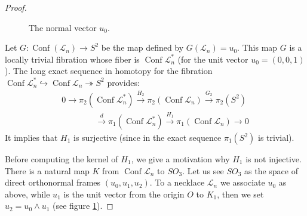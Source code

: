 \documentclass[11pt]{amsart}
\begin{document}
\begin{proof}
\begin{figure}
 
 \caption{The normal vector $u_0$. \label{fig:uzero}}
\end{figure}

Let $G : {\mathop{\mathrm{Conf}}\nolimits}(\mathcal{L}_n) \to S^2$ be the map defined
by $G(\mathcal{L}_n) = u_0$. This map $G$ is a locally trivial fibration
whose fiber is ${\mathop{\mathrm{Conf}}\nolimits} \mathcal{L}_n^*$ (for the unit vector $u_0 = (0,0,1)$).
The long exact sequence in homotopy for the fibration 
${\mathop{\mathrm{Conf}}\nolimits} \mathcal{L}_n^* \hookrightarrow {\mathop{\mathrm{Conf}}\nolimits} \mathcal{L}_n \twoheadrightarrow S^2$
provides:
$$
\begin{array}{c}
0 
\longrightarrow \pi_2({\mathop{\mathrm{Conf}}\nolimits} \mathcal{L}_n^*)
\overset{H_2}{\longrightarrow} \pi_2({\mathop{\mathrm{Conf}}\nolimits} \mathcal{L}_n)
\overset{G_2}{\longrightarrow} \pi_2(S^2) \\
\qquad\qquad \overset{d}{\longrightarrow} \pi_1({\mathop{\mathrm{Conf}}\nolimits} \mathcal{L}_n^*)
\overset{H_1}{\longrightarrow} \pi_1({\mathop{\mathrm{Conf}}\nolimits} \mathcal{L}_n)
\longrightarrow 0
\end{array}$$
It implies that $H_1$ is surjective (since in the exact sequence $\pi_1(S^2)$ is trivial).

\bigskip

Before computing the kernel of $H_1$, we give a motivation why $H_1$ is not injective.
There is a natural map $K$ from ${\mathop{\mathrm{Conf}}\nolimits} \mathcal{L}_n$ to $SO_3$.
Let us see $SO_3$ as the space of direct orthonormal frames $(u_0,u_1,u_2)$.
To a necklace $\mathcal{L}_n$ we associate $u_0$ as above, while $u_1$ is the unit vector
from the origin $O$ to $K_1$, then we set $u_2 = u_0 \wedge u_1$ (see figure \ref{fig:uzero}). 


\end{proof}
\end{document}
